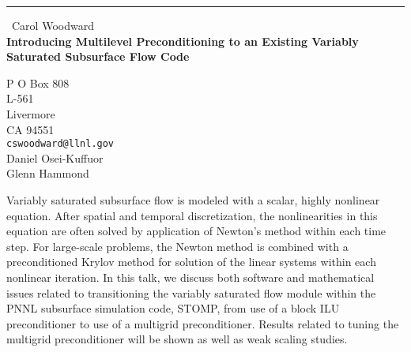 \documentclass{report}
\begin{document}
\begin{center}
\rule{6in}{1pt} \
{\large Carol Woodward \\
{\bf Introducing Multilevel Preconditioning to an Existing Variably Saturated Subsurface Flow Code}}

P O Box 808 \\ L-561 \\ Livermore \\ CA 94551
\\
{\tt cswoodward@llnl.gov}\\
Daniel Osei-Kuffuor\\
Glenn Hammond\end{center}

Variably saturated subsurface flow is modeled with a scalar, highly
nonlinear equation. After spatial and temporal discretization, the
nonlinearities in this equation are often solved by application of
Newton's method within each time step. For large-scale problems, the
Newton method is combined with a preconditioned Krylov method for
solution of the linear systems within each nonlinear iteration. In this
talk, we discuss both software and mathematical issues related to
transitioning the variably saturated flow module within the PNNL
subsurface simulation code, STOMP, from use of a block ILU preconditioner
to use of a multigrid preconditioner. Results related to tuning the
multigrid preconditioner will be shown as well as weak scaling studies.
\end{document}
